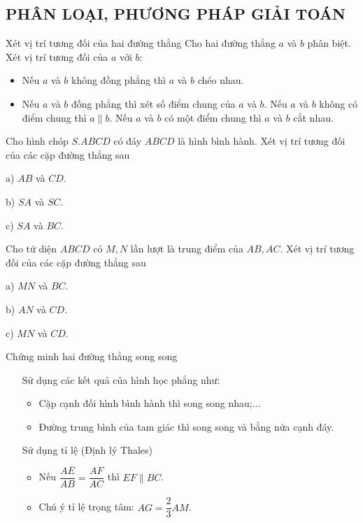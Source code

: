 \subsection{PHÂN LOẠI, PHƯƠNG PHÁP GIẢI TOÁN}
\begin{dang} {Xét vị trí tương đối của hai đường thẳng}
	Cho hai đường thẳng $a$ và $b$ phân biệt. Xét vị trí tương đối của $a$ với $b$:
	\begin{itemize}
		\item Nếu $a$ và $b$ không đồng phẳng thì $a$ và $b$ chéo nhau.
		\item Nếu $a$ và $b$ đồng phẳng thì xét số điểm chung của $a$ và $b$. Nếu $a$ và $b$ không có điểm chung thì $a\parallel b$. Nếu $a$ và $b$ có một điểm chung thì $a$ và $b$ cắt nhau.
	\end{itemize}
\end{dang}
\begin{vd}
	Cho hình chóp $S.ABCD$ có đáy $ABCD$ là hình bình hành. Xét vị trí tương đối của các cặp đường thẳng sau
	\begin{listEX}[3]
		\item [a)] $AB$ và $CD$.
		\item [b)] $SA$ và $SC$.
		\item [c)] $SA$ và $BC$.
	\end{listEX}
\end{vd}
\begin{vd}
	Cho tứ diện $ABCD$ có $M, N$ lần lượt là trung điểm của $AB, AC$. Xét vị trí tương đối của các cặp đường thẳng sau
	\begin{listEX}[3]
		\item [a)] $MN$ và $BC$.
		\item [b)] $AN$ và $CD$.
		\item [c)] $MN$ và $CD$.
	\end{listEX}
\end{vd}
\begin{dang}{Chứng minh hai đường thẳng song song}
	\begin{itemize}
		\item [\ding{172}] Sử dụng các kết quả của hình học phẳng như:
		      \begin{itemize}
			      \item  Cặp cạnh đối hình bình hành thì song song nhau;...
			      \item  Đường trung bình của tam giác thì song song và bằng nửa cạnh đáy.
		      \end{itemize}
		\item [\ding{173}] Sử dụng tỉ lệ (Định lý Thales)
		      \begin{itemize}
			      \item Nếu $\dfrac{AE}{AB}=\dfrac{AF}{AC}$ thì $EF \parallel BC$.
			      \item Chú ý tỉ lệ trọng tâm:  $AG=\dfrac{2}{3}AM$.
		      \end{itemize}
	\end{itemize}
\end{dang}

